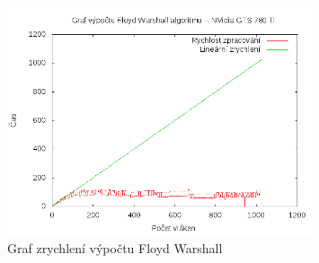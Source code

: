 \documentclass[a4paper,10pt]{article}
\begin{document}
\begin{figure}[H]
  \centering
    \includegraphics[width=0.8\textwidth]{graf_floyd_gts_780_Ti.png}
  \caption{Graf zrychlení výpočtu Floyd Warshall}
  \label{fig:floydcudatwo}
\end{figure}

\newpage



\end{document}
